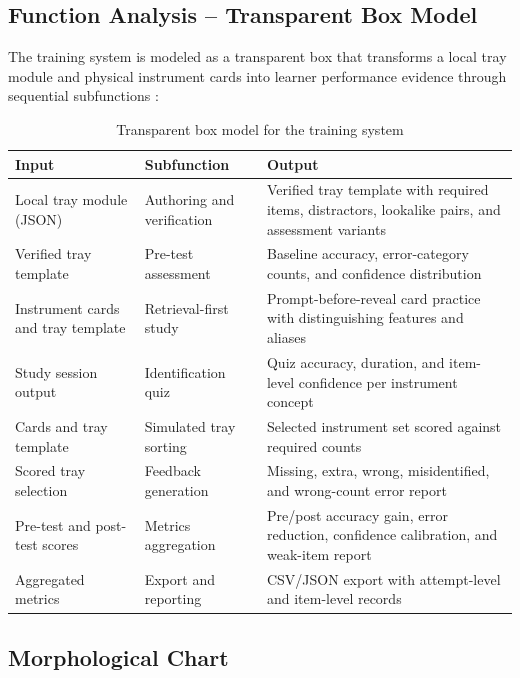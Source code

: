 \documentclass[10pt,a4paper]{article}
\begin{document}
\subsection{Function Analysis -- Transparent Box Model}
\label{sec:function-analysis-transparent-box-model}

The training system is modeled as a transparent box that transforms a local tray
module and physical instrument cards into learner performance evidence through
sequential subfunctions \cite{pahl-beitz-2007}:

\begin{table}[H]
\centering
\caption{Transparent box model for the training system}
\label{tab:transparent-box-model}
\small\renewcommand{\arraystretch}{1.2}\setlength{\tabcolsep}{4pt}
\begin{tabularx}{\textwidth}{|>{\raggedright\arraybackslash}X|>{\raggedright\arraybackslash}X|>{\raggedright\arraybackslash}X|}
\hline
Input & Subfunction & Output \\
\hline
Local tray module (JSON) & Authoring and verification & Verified tray template with required items, distractors, lookalike pairs, and assessment variants \\
\hline
Verified tray template & Pre-test assessment & Baseline accuracy, error-category counts, and confidence distribution \\
\hline
Instrument cards and tray template & Retrieval-first study & Prompt-before-reveal card practice with distinguishing features and aliases \\
\hline
Study session output & Identification quiz & Quiz accuracy, duration, and item-level confidence per instrument concept \\
\hline
Cards and tray template & Simulated tray sorting & Selected instrument set scored against required counts \\
\hline
Scored tray selection & Feedback generation & Missing, extra, wrong, misidentified, and wrong-count error report \\
\hline
Pre-test and post-test scores & Metrics aggregation & Pre/post accuracy gain, error reduction, confidence calibration, and weak-item report \\
\hline
Aggregated metrics & Export and reporting & CSV/JSON export with attempt-level and item-level records \\
\hline
\end{tabularx}
\end{table}

\subsection{Morphological Chart}
\label{sec:morphological-chart}
\end{document}

